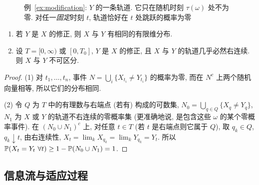 \begin{figure}[htbp]
\centering
{}
\caption{例~\ref{ex:modification}: $Y$ 的一条轨道. 它只在随机时刻 $\tau(\omega)$ 处不为零. 对任一\emph{固定}时刻 $t$, 轨道恰好在 $t$ 处跳跃的概率为零}
\label{fig:modification}
\end{figure}

\begin{proposition}\label{prop:modification}
\begin{enumerate}
\item 若 $Y$ 是 $X$ 的修正, 则 $X$ 与 $Y$ 有相同的有限维分布.
\item 设 $T=[0,\infty)$ 或 $[0,T_0]$, $Y$ 是 $X$ 的修正, 且 $X$ 与 $Y$ 的轨道几乎必然右连续. 则 $X$ 与 $Y$ 不可区分.
\end{enumerate}
\end{proposition}

\begin{proof}
(1) 对 $t_1,\dots,t_n$, 事件 $N=\bigcup_i\{X_{t_i}\ne Y_{t_i}\}$ 的概率为零, 而在 $N^c$ 上两个随机向量相等, 所以它们的分布相同.

(2) 令 $Q$ 为 $T$ 中的有理数与右端点 (若有) 构成的可数集, $N_0=\bigcup_{q\in Q}\{X_q\ne Y_q\}$, $N_1$ 为 $X$ 或 $Y$ 的轨道不右连续的零概率集 (更准确地说, 是包含这些 $\omega$ 的某个零概率事件). 在 $(N_0\cup N_1)^c$ 上, 对任意 $t\in T$ (若 $t$ 是右端点则它属于 $Q$), 取 $q_k\in Q$, $q_k\downarrow t$, 由右连续性,
$X_t=\lim_kX_{q_k}=\lim_kY_{q_k}=Y_t$. 所以 $\P(X_t=Y_t\ \forall t)\ge1-\P(N_0\cup N_1)=1$.
\end{proof}

\subsection{信息流与适应过程}

